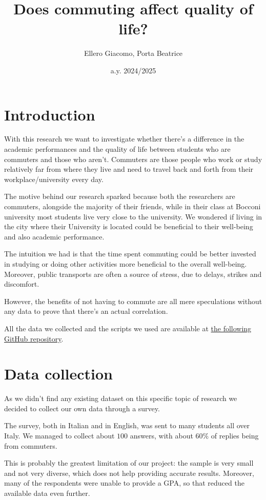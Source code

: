 \documentclass[11pt]{extarticle}
\title{Does commuting affect quality of life?}
\author{Ellero Giacomo, Porta Beatrice}
\date{a.y. 2024/2025}
\numberwithin{table}{section}
\numberwithin{figure}{section}
\numberwithin{equation}{section}
\begin{document}
\maketitle

\section{Introduction}

With this research we want to investigate whether there’s a difference in the academic performances
and the quality of life between students who are commuters and those who aren't.
Commuters are those people who work or study relatively far from where they live
and need to travel back and forth from their workplace/university every day.

The motive behind our research sparked because both the researchers are commuters,
alongside the majority of their friends, while in their class at Bocconi university most students
live very close to the university.
We wondered if living in the city where their University is located could be beneficial
to their well-being and also academic performance.

The intuition we had is that the time spent commuting could be better invested in studying
or doing other activities more beneficial to the overall well-being.
Moreover, public transports are often a source of stress, due to delays, strikes and discomfort.

However, the benefits of not having to commute are all mere speculations without any data to prove
that there’s an actual correlation.

All the data we collected and the scripts we used are available at
\href{https://github.com/billy4479/stats-research-project}{the following GitHub repository}.

\section{Data collection}

As we didn't find any existing dataset on this specific topic of research we decided
to collect our own data through a survey.

The survey, both in Italian and in English, was sent to many students all over Italy.
We managed to collect about $100$ answers, with about $60\%$ of replies being from commuters.

This is probably the greatest limitation of our project:
the sample is very small and not very diverse, which does not help providing accurate results.
Moreover, many of the respondents were unable to provide a GPA,
so that reduced the available data even further.
\end{document}
